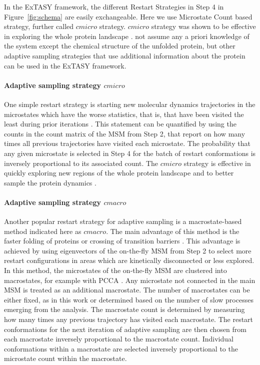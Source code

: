 In the ExTASY framework, the different Restart Strategies in Step 4 in
Figure~\ref{fig:schema} are easily exchangeable. Here we use  Microstate Count based strategy, further called $cmicro$
strategy.  $cmicro$ strategy was shown to be 
effective in exploring the whole protein landscape \cite{Adstrategies2018}. 
 not assume any a priori knowledge of the system except
the chemical structure of the unfolded protein, but other adaptive sampling
strategies that use additional information about the protein can be used in
the ExTASY framework.

\paragraph{Adaptive sampling strategy $cmicro$}
One simple restart strategy is starting new molecular dynamics trajectories in
the microstates which have the worse statistics, that is, that have been visited the least during prior iterations
\cite{weber2011characterization, Fabritiis-2014, AdaptivePELE-Lecina2017,
doerr2016htmd}. This statement can be quantified by using the counts in the count matrix of the MSM from Step 2,
that report on how many times all previous trajectories have visited each
microstate.  The probability that any given microstate is selected in Step 4 for
the batch of restart conformations is inversely proportional to its associated count. The $cmicro$ strategy is effective in quickly exploring new regions of the whole protein landscape and to better sample the protein dynamics \cite{Adstrategies2018}.


\paragraph{\label{sec:macro} Adaptive sampling strategy $cmacro$} 
Another popular restart strategy for adaptive sampling is a macrostate-based
method indicated here as $cmacro$. The main advantage of this
method is the faster folding of proteins or crossing of transition barriers
\cite{Adstrategies2018}. This advantage is achieved by using eigenvectors of
the on-the-fly MSM from Step 2 to select more restart configurations in areas which are
kinetically disconnected or less explored. In this method, the microstates of
the on-the-fly MSM are clustered into macrostates, for
example with PCCA \cite{roblitz2013fuzzy}. Any microstate not connected in the
main MSM is treated as an additional macrostate. The number of macrostates can
be either fixed, as in this work or determined based on the number of
slow processes emerging from the analysis. The macrostate count is determined by
measuring how many times any previous trajectory has visited each macrostate.
The restart conformations for the next iteration of adaptive sampling are then
chosen from each macrostate inversely proportional to the macrostate count.
Individual conformations within a macrostate are selected inversely
proportional to the microstate count within the macrostate.

